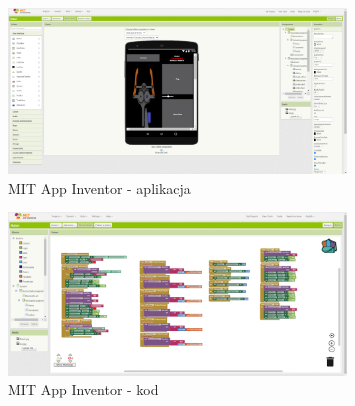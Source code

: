 \documentclass[11pt,titlepage,a4paper]{article}
\begin{document}
\begin{figure}[h!]
    \begin{center}
        \includegraphics[width=0.8\textwidth]{img/app_src/MITapp.png}
    \end{center}
    \caption{MIT App Inventor - aplikacja}
    \label{MITapp}
\end{figure}

\begin{figure}[h!]
    \begin{center}
        \includegraphics[width=0.8\textwidth]{img/app_src/MITblocks.png}
    \end{center}
    \caption{MIT App Inventor - kod}
    \label{MITblocks}
\end{figure}
\end{document}
